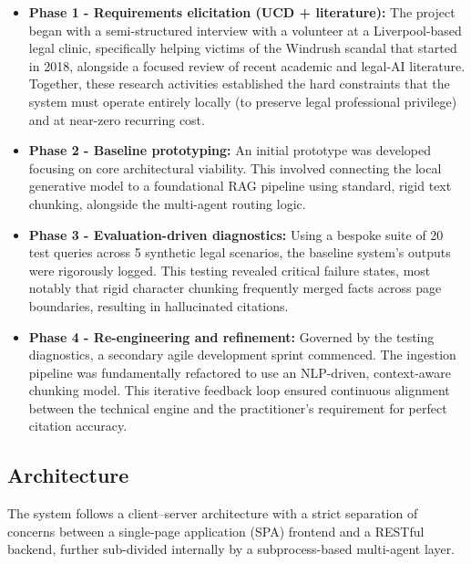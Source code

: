\documentclass[11pt,a4paper]{article}
\begin{document}
\begin{itemize}
    \item \textbf{Phase 1 - Requirements elicitation (UCD + literature):} The project began with a semi-structured interview with a volunteer at a Liverpool-based legal clinic, specifically helping victims of the Windrush scandal that started in 2018, alongside a focused review of recent academic and legal-AI literature. Together, these research activities established the hard constraints that the system must operate entirely locally (to preserve legal professional privilege) and at near-zero recurring cost.
    \item \textbf{Phase 2 - Baseline prototyping:} An initial prototype was developed focusing on core architectural viability. This involved connecting the local generative model to a foundational RAG pipeline using standard, rigid text chunking, alongside the multi-agent routing logic.
    \item \textbf{Phase 3 - Evaluation-driven diagnostics:} Using a bespoke suite of 20 test queries across 5 synthetic legal scenarios, the baseline system's outputs were rigorously logged. This testing revealed critical failure states, most notably that rigid character chunking frequently merged facts across page boundaries, resulting in hallucinated citations.
    \item \textbf{Phase 4 - Re-engineering and refinement:} Governed by the testing diagnostics, a secondary agile development sprint commenced. The ingestion pipeline was fundamentally refactored to use an NLP-driven, context-aware chunking model. This iterative feedback loop ensured continuous alignment between the technical engine and the practitioner's requirement for perfect citation accuracy.
\end{itemize}

\subsection{Architecture}

The system follows a client--server architecture with a strict separation of concerns between a single-page application (SPA) frontend and a RESTful backend, further sub-divided internally
by a subprocess-based multi-agent layer.
\end{document}
